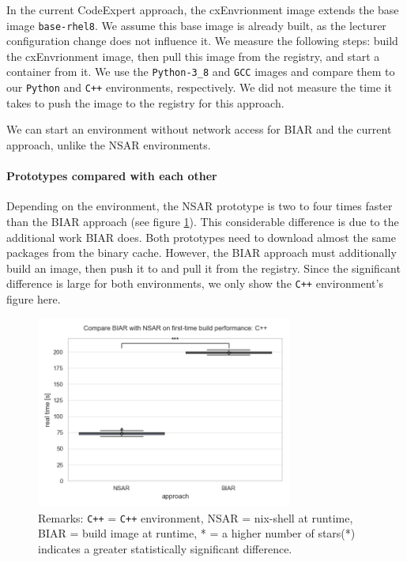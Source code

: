 In the current CodeExpert approach, the cxEnvrionment image extends the base image \verb|base-rhel8|. We assume this base image is already built, as the lecturer configuration change does not influence it. We measure the following steps: build the cxEnvrionment image, then pull this image from the registry, and start a container from it. We use the \verb|Python-3_8| and \verb|GCC| images and compare them to our \verb|Python| and \verb|C++| environments, respectively. We did not measure the time it takes to push the image to the registry for this approach.

We can start an environment without network access for BIAR and the current approach, unlike the NSAR environments.

\paragraph{Prototypes compared with each other}
Depending on the environment, the NSAR prototype is two to four times faster than the BIAR approach (see figure \ref{fig:nsar-biar-first-time-build-python}). This considerable difference is due to the additional work BIAR does. Both prototypes need to download almost the same packages from the binary cache. However, the BIAR approach must additionally build an image, then push it to and pull it from the registry. Since the significant difference is large for both environments, we only show the \verb|C++| environment’s figure here. 
\begin{figure}
  \centering
  \includegraphics[width=0.75\textwidth]{thesis/graphics/compare-plots/compare_biar_with_nsar_on_first-time_build_performance:_c++.png}
  \caption{Remarks: \texttt{C++} = \texttt{C++} environment, NSAR = nix-shell at runtime, BIAR = build image at runtime, * = a higher number of stars(*) indicates a greater statistically significant difference.}
  \label{fig:nsar-biar-first-time-build-python}
\end{figure}

